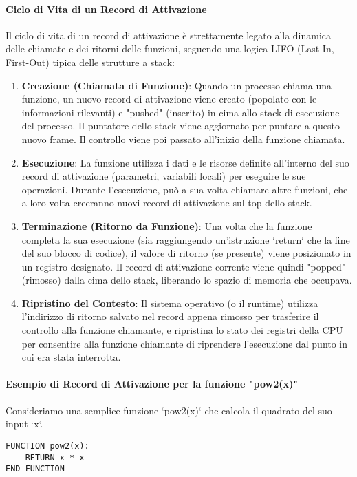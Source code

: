 \paragraph{Ciclo di Vita di un Record di Attivazione}
Il ciclo di vita di un record di attivazione è strettamente legato alla dinamica delle chiamate e dei ritorni delle funzioni, seguendo una logica LIFO (Last-In, First-Out) tipica delle strutture a stack:
\begin{enumerate}
    \item \textbf{Creazione (Chiamata di Funzione)}: Quando un processo chiama una funzione, un nuovo record di attivazione viene creato (popolato con le informazioni rilevanti) e "pushed" (inserito) in cima allo stack di esecuzione del processo. Il puntatore dello stack viene aggiornato per puntare a questo nuovo frame. Il controllo viene poi passato all'inizio della funzione chiamata.
    \item \textbf{Esecuzione}: La funzione utilizza i dati e le risorse definite all'interno del suo record di attivazione (parametri, variabili locali) per eseguire le sue operazioni. Durante l'esecuzione, può a sua volta chiamare altre funzioni, che a loro volta creeranno nuovi record di attivazione sul top dello stack.
    \item \textbf{Terminazione (Ritorno da Funzione)}: Una volta che la funzione completa la sua esecuzione (sia raggiungendo un'istruzione `return` che la fine del suo blocco di codice), il valore di ritorno (se presente) viene posizionato in un registro designato. Il record di attivazione corrente viene quindi "popped" (rimosso) dalla cima dello stack, liberando lo spazio di memoria che occupava.
    \item \textbf{Ripristino del Contesto}: Il sistema operativo (o il runtime) utilizza l'indirizzo di ritorno salvato nel record appena rimosso per trasferire il controllo alla funzione chiamante, e ripristina lo stato dei registri della CPU per consentire alla funzione chiamante di riprendere l'esecuzione dal punto in cui era stata interrotta.
\end{enumerate}

\paragraph{Esempio di Record di Attivazione per la funzione "pow2(x)"}
Consideriamo una semplice funzione `pow2(x)` che calcola il quadrato del suo input `x`.

\begin{lstlisting}[language=Pseudocode, numbers=none, caption={Funzione pow2(x)}]
FUNCTION pow2(x):
    RETURN x * x
END FUNCTION
\end{lstlisting}

